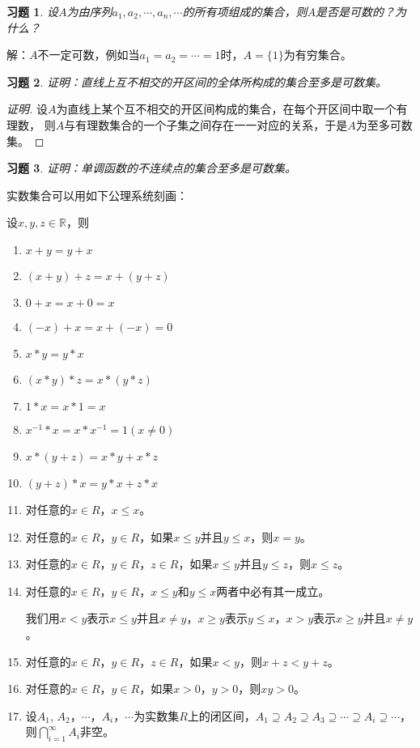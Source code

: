 \documentclass{article}
\begin{document}
\begin{CJK}{UTF8}{gbsn}
\newtheorem{Exercise}{习题}
\begin{Exercise}
设$A$为由序列$a_1,a_2,\cdots,a_n,\cdots$的所有项组成的集合，则$A$是否是可数的？为什么？
\end{Exercise}
解：$A$不一定可数，例如当$a_1=a_2=\cdots=1$时，$A=\{1\}$为有穷集合。
\begin{Exercise}
  证明：直线上互不相交的开区间的全体所构成的集合至多是可数集。
\end{Exercise}
\begin{proof}[证明]
  设$A$为直线上某个互不相交的开区间构成的集合，在每个开区间中取一个有理数，
  则$A$与有理数集合的一个子集之间存在一一对应的关系，于是$A$为至多可数集。
\end{proof}
\begin{Exercise}
  证明：单调函数的不连续点的集合至多是可数集。
\end{Exercise}

实数集合可以用如下公理系统刻画：

设$x, y, z \in \mathbb{R}$，则
\begin{enumerate}
\item   $x + y = y + x$
\item   $(x + y) + z = x + (y + z)$
\item   $0 + x = x + 0 = x$
\item   $(-x) + x =x + (-x) = 0$
\item   $x * y = y * x$
\item   $(x * y) * z = x * (y *z)$
\item   $1 * x = x * 1 = x$
\item   $x^{-1} * x = x * x^{-1} = 1 (x \neq 0)$
\item   $x* (y + z) = x * y + x * z$
\item   $(y + z) * x = y * x + z * x$
\item 对任意的$x\in R$，$x\leq x$。
\item 对任意的$x\in R$，$y\in R$，如果$x\leq y$并且$y\leq x$，则$x=y$。 
\item 对任意的$x\in R$，$y\in R$，$z\in R$，如果$x\leq y$并且$y\leq z$，则$x\leq z$。
\item 对任意的$x\in R$，$y\in R$，$x\leq y$和$y\leq x$两者中必有其一成立。

我们用$x<y$表示$x\leq y$并且$x\neq y$，$x\geq y$表示$y\leq x$，$x > y$表示$x\geq y$并且$x\neq y$。

\item 对任意的$x\in R$，$y\in R$，$z\in R$，如果$x<y$，则$x+z<y+z$。
\item 对任意的$x\in R$，$y\in R$，如果$x>0$，$y>0$，则$xy>0$。
\item 设$A_1$, $A_2$，$\cdots$，$A_i$，$\cdots$为实数集$R$上的闭区间，$A_1\supseteq A_2 \supseteq A_3 \supseteq \cdots \supseteq A_i \supseteq \cdots$，则$\bigcap_{i=1}^{\infty}A_i$非空。
\end{enumerate}



\end{CJK}
\end{document}

